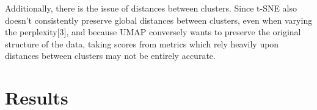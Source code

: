 \documentclass[11pt]{article}
\theoremstyle{definition}
\begin{document}
\begin{comment}
Maybe find another metric which doesn't rely as heavily upon density/distance--or not just those two measurements.
\end{comment}
\newline
Additionally, there is the issue of distances between clusters. Since t-SNE also doesn't consistently preserve global distances between clusters, even when varying the perplexity[3], and because UMAP conversely wants to preserve the original structure of the data, taking scores from metrics which rely heavily upon distances between clusters may not be entirely accurate. 
\begin{comment}
Maybe use an already established data set which gives "good" clusters for t-SNE and UMAP so that the ratio of the scores can be measured instead of directly comparing the two scores from different algorithms.
\end{comment}

\begin{comment}
Find a control data set?
\end{comment}

\section{Results}
\end{document}
